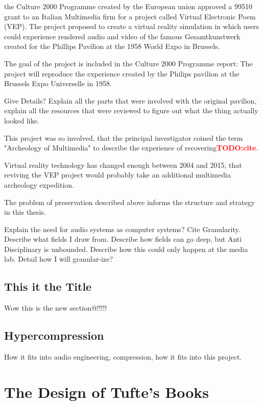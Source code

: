\documentclass{tufte-book}
\newcommand{\TODO}[1]{\textcolor{red}{\bf TODO:#1}\xspace}
\begin{document}
 the Culture 2000 Programme created by the 
European union approved a 99510\EUR{} grant to an Italian Multimedia 
firm for a project called Virtual Electronic Poem (VEP)\cite{eu2004}. 
The project proposed to create a virtual reality simulation in which 
users could experience rendered audio and video of the famous
Gesamtkunstwerk created for the Phillips Pavilion at the 1958 World
Expo in Brussels. 

The goal of the project is included in the Culture 2000 Programme
report: The project will reproduce the experience created by the
Philips pavilion at the Brussels Expo Universelle in 1958.

Give Details? Explain all the parts that were involved with the
original pavilion, explain all the resources that were reviewed to
figure out what the thing actually looked like.

This project was so involved, that the principal investigator coined
the term "Archeology of Multimedia" to describe the experience of
recovering\TODO{cite}.

Virtual reality technology has changed enough between 2004 and 2015,
that reviving the VEP project would probably take an additional
multimedia archeology expedition.

The problem of preservation described above informs the structure and
strategy in this thesis. 

Explain the need for audio systems as computer systems? Cite
Granularity. Describe what fields I draw from. Describe how fields can
go deep, but Anti Disciplinary is unbounded. Describe how this could
only happen at the media lab. Detail how I will granular-ize?

\section{This it the Title}
\label{sec:this-it-title}
Wow this is the new section@!!!!!


\section{Hypercompression}
How it fits into audio engineering, compression, how it fits into this project. 


\chapter{The Design of Tufte's Books}
\label{ch:tufte-design}
\end{document}
